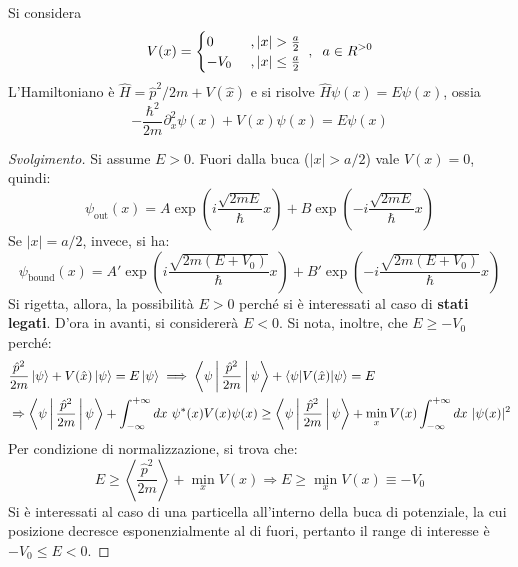 \documentclass[11pt, a4paper]{scrartcl} %
\numberwithin{equation}{subsection}
\theoremstyle{style2}
\theoremstyle{style1}
\renewcommand\qedsymbol{$\blacksquare$}
\newenvironment{svolgimento}{\renewcommand\qedsymbol{$\spadesuit$}\begin{proof}[Svolgimento]}{\end{proof}}
\begin{document}
Si considera 
\[
V(x) = \begin{cases}
 0 & \ , \lvert x \rvert > \frac{a}{2}\\
-V_0 &\ , \lvert x \rvert \le \frac{a}{2}
\end{cases}\hspace{.1cm} , \hspace{.2cm} a \in R^{>0} 
\] 
L'Hamiltoniano \`e $\hat{H} = \hat{p}^2 / 2m + V(\hat{x})$ e si risolve $\hat{H}\psi (x) = E \psi (x)$, ossia
\begin{equation}
	-\frac{\hbar ^2}{2m} \partial _x^2 \psi (x) + V(x) \psi (x) = E\psi (x)
\end{equation}
\begin{svolgimento}
	Si assume $E>0$. Fuori dalla buca ($\lvert x \rvert > a / 2$) vale $V(x) = 0$, quindi:
	\begin{equation}
		\psi _\text{out}(x) = A \exp \left(i \frac{\sqrt{2mE} }{\hbar }x\right) + B \exp \left( - i \frac{\sqrt{2mE} }{\hbar } x\right) 
	\end{equation}
	Se $\lvert x \rvert = a / 2$, invece, si ha:
	\begin{equation}
		\psi _\text{bound}(x) = A' \exp \left(i \frac{\sqrt{2m(E+V_0)} }{\hbar }x\right) + B' \exp \left( - i \frac{\sqrt{2m(E+V_0)} }{\hbar } x\right) 
	\end{equation}
	Si rigetta, allora, la possibilit\`a $E>0$ perch\'e si \`e interessati al caso di \textbf{stati legati}. D'ora in avanti, si considerer\`a $E<0$. Si nota, inoltre, che $E\ge -V_0$ perch\'e:
	\[
	\begin{split}
		&\frac{\hat{p}^2}{2m} \ket{\psi }  + V(\hat{x}) \ket{\psi } = E \ket{\psi } \implies \Braket{\psi |\frac{\hat{p}^2}{2m}|\psi } + \braket{\psi |V(\hat{x})|\psi } = E\\
		&\Rightarrow \Braket{\psi |\frac{\hat{p}^2}{2m}|\psi } + \int_{-\infty} ^{+\infty} dx\ \psi ^*(x) V(x) \psi (x) \ge \Braket{\psi |\frac{\hat{p}^2}{2m}|\psi } + \min_x V(x) \int_{-\infty} ^{+\infty} dx\ \lvert \psi (x) \rvert ^2
	\end{split}
	\] 
Per condizione di normalizzazione, si trova che: 
\begin{equation}
	E \ge \left\langle \frac{\hat{p}^2}{2m} \right\rangle + \min_x V(x) \Rightarrow  E\ge  \min_x V(x) \equiv -V_0
\end{equation}
Si \`e interessati al caso di una particella all'interno della buca di potenziale, la cui posizione decresce esponenzialmente al di fuori, pertanto il range di interesse \`e $-V_0\le E <0$. 


\end{svolgimento}
\end{document}
